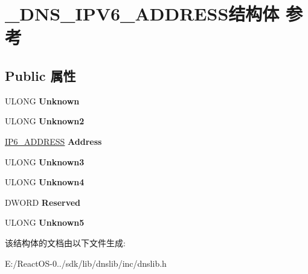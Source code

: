 \hypertarget{struct___d_n_s___i_p_v6___a_d_d_r_e_s_s}{}\section{\+\_\+\+D\+N\+S\+\_\+\+I\+P\+V6\+\_\+\+A\+D\+D\+R\+E\+S\+S结构体 参考}
\label{struct___d_n_s___i_p_v6___a_d_d_r_e_s_s}
\subsection*{Public 属性}
\begin{DoxyCompactItemize}
\item 
\mbox{\label{struct___d_n_s___i_p_v6___a_d_d_r_e_s_s_a79a8403e11ef8eb0352bea69f2864b40}} 
U\+L\+O\+NG {\bfseries Unknown}
\item 
\mbox{\label{struct___d_n_s___i_p_v6___a_d_d_r_e_s_s_a20604ed5221ecc3821f064627f6e7129}} 
U\+L\+O\+NG {\bfseries Unknown2}
\item 
\mbox{\label{struct___d_n_s___i_p_v6___a_d_d_r_e_s_s_a111fdc0d998b901613cacbe5f77ccc0b}} 
\hyperlink{struct_i_p6___a_d_d_r_e_s_s}{I\+P6\+\_\+\+A\+D\+D\+R\+E\+SS} {\bfseries Address}
\item 
\mbox{\label{struct___d_n_s___i_p_v6___a_d_d_r_e_s_s_ab48ee31548be6a948c46025d9eeaeef9}} 
U\+L\+O\+NG {\bfseries Unknown3}
\item 
\mbox{\label{struct___d_n_s___i_p_v6___a_d_d_r_e_s_s_a34b67099edcdb1c5ceb691dad8f19f4a}} 
U\+L\+O\+NG {\bfseries Unknown4}
\item 
\mbox{\label{struct___d_n_s___i_p_v6___a_d_d_r_e_s_s_ac33b67b6461397f68161b30501709317}} 
D\+W\+O\+RD {\bfseries Reserved}
\item 
\mbox{\label{struct___d_n_s___i_p_v6___a_d_d_r_e_s_s_a2dbcd2c7cfa0e47f079f7aedc7a3f709}} 
U\+L\+O\+NG {\bfseries Unknown5}
\end{DoxyCompactItemize}


该结构体的文档由以下文件生成\+:\begin{DoxyCompactItemize}
\item 
E\+:/\+React\+O\+S-\/0../sdk/lib/dnslib/inc/dnslib.\+h\end{DoxyCompactItemize}
